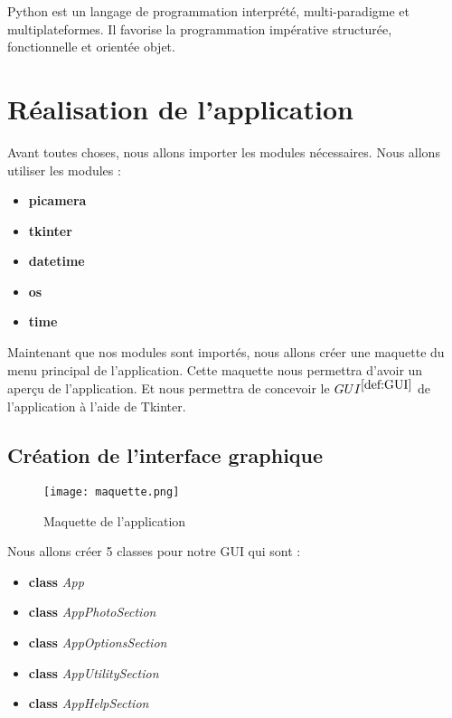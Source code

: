         \vspace{0.2cm}
        
        Python est un langage de programmation interprété, multi-paradigme et multiplateformes. Il favorise la programmation impérative structurée, fonctionnelle et orientée objet.
        


    
    \section{Réalisation de l'application}
        Avant toutes choses, nous allons importer les modules nécessaires.
        Nous allons utiliser les modules :
        \begin{itemize}
            \item \textbf{picamera}
            \item \textbf{tkinter}
            \item \textbf{datetime}
            \item \textbf{os}
            \item \textbf{time}
        \end{itemize}

        
        Maintenant que nos modules sont importés, nous allons créer une maquette du menu principal de l'application.
        Cette maquette nous permettra d'avoir un aperçu de l'application.
        Et nous permettra de concevoir le \underline{$GUI^{\ref{def:GUI}}$} de l'application à l'aide de Tkinter.            

        \subsection{Création de l'interface graphique}
            \begin{figure}[ht]
                \centering
                \texttt{[image: maquette.png]} 
                \caption{Maquette de l'application}
            \end{figure}

            \begin{flushleft}
                Nous allons créer 5 classes pour notre GUI qui sont :
                \begin{itemize}
                    \item \textbf{class} \textit{App}
                    \item \textbf{class} \textit{AppPhotoSection}
                    \item \textbf{class} \textit{AppOptionsSection}
                    \item \textbf{class} \textit{AppUtilitySection}
                    \item \textbf{class} \textit{AppHelpSection}
                \end{itemize}                            
            \end{flushleft}


